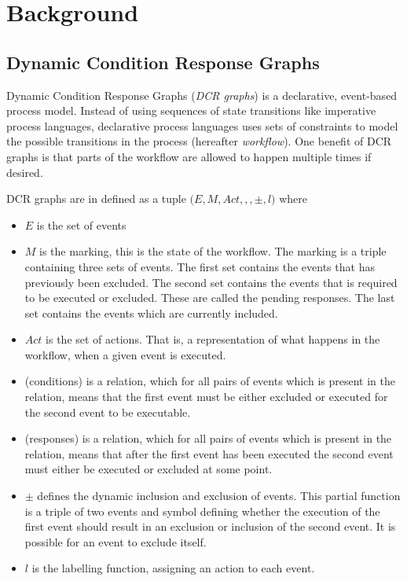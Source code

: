 \chapter{Background}\label{chap:background}
	\section{Dynamic Condition Response Graphs}
	Dynamic Condition Response Graphs (\textit{DCR graphs}) is a declarative, event-based process model. Instead of using sequences of state transitions like imperative process languages, declarative process languages uses sets of constraints to model the possible transitions in the process (hereafter \textit{workflow}). One benefit of DCR graphs is that parts of the workflow are allowed to happen multiple times if desired.
	
	
	\newpar DCR graphs are in \cite{hildebrandt2011declarative} defined as a tuple $(E, M, Act, $\condition$, $\response$, \pm, l)$ where
	\begin{itemize}
		\item $E$ is the set of events
		\item $M$ is the marking, this is the state of the workflow. The marking is a triple containing three sets of events. The first set contains the events that has previously been excluded. The second set contains the events that is required to be executed or excluded. These are called the pending responses. The last set contains the events which are currently included.
		\item $Act$ is the set of actions. That is, a representation of what happens in the workflow, when a given event is executed.
		\item \condition (conditions) is a relation, which for all pairs of events which is present in the relation, means that the first event must be either excluded or executed for the second event to be executable.
		\item \response (responses) is a relation, which for all pairs of events which is present in the relation, means that after the first event has been executed the second event must either be executed or excluded at some point.
		\item $\pm$ defines the dynamic inclusion and exclusion of events. This partial function is a triple of two events and symbol defining whether the execution of the first event should result in an exclusion or inclusion of the second event. It is possible for an event to exclude itself.
		\item $l$ is the labelling function, assigning an action to each event.
	\end{itemize}
		
